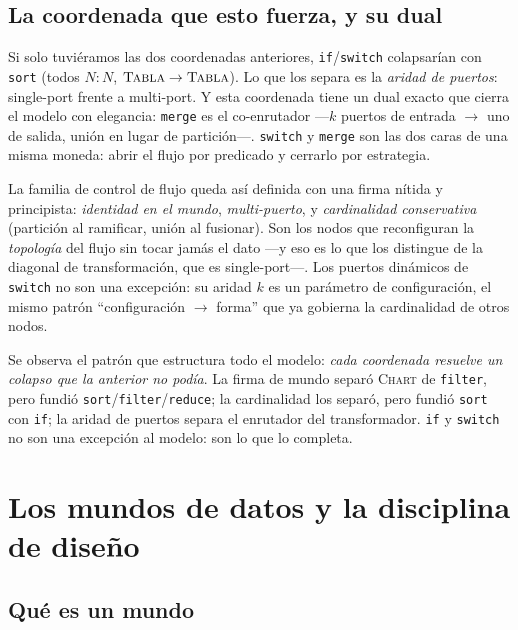 \documentclass[11pt,a4paper]{article}
\theoremstyle{definition}
\theoremstyle{plain}
\newcommand{\mundo}[1]{\textsc{#1}}   %
\begin{document}
\subsection{La coordenada que esto fuerza, y su dual}

Si solo tuviéramos las dos coordenadas anteriores, \texttt{if}/\texttt{switch}
colapsarían con \texttt{sort} (todos $N{:}N$, $\mundo{Tabla}\to\mundo{Tabla}$). Lo
que los separa es la \emph{aridad de puertos}: single-port frente a multi-port. Y
esta coordenada tiene un dual exacto que cierra el modelo con elegancia:
\texttt{merge} es el co-enrutador ---$k$ puertos de entrada $\to$ uno de salida,
unión en lugar de partición---. \texttt{switch} y \texttt{merge} son las dos caras
de una misma moneda: abrir el flujo por predicado y cerrarlo por estrategia.

La familia de control de flujo queda así definida con una firma nítida y
principista: \emph{identidad en el mundo}, \emph{multi-puerto}, y \emph{cardinalidad
conservativa} (partición al ramificar, unión al fusionar). Son los nodos que
reconfiguran la \emph{topología} del flujo sin tocar jamás el dato ---y eso es lo que
los distingue de la diagonal de transformación, que es single-port---. Los puertos
dinámicos de \texttt{switch} no son una excepción: su aridad $k$ es un parámetro de
configuración, el mismo patrón ``configuración $\to$ forma'' que ya gobierna la
cardinalidad de otros nodos.

Se observa el patrón que estructura todo el modelo: \emph{cada coordenada resuelve
un colapso que la anterior no podía}. La firma de mundo separó \mundo{Chart} de
\texttt{filter}, pero fundió \texttt{sort}/\texttt{filter}/\texttt{reduce}; la
cardinalidad los separó, pero fundió \texttt{sort} con \texttt{if}; la aridad de
puertos separa el enrutador del transformador. \texttt{if} y \texttt{switch} no son
una excepción al modelo: son lo que lo completa.

\section{Los mundos de datos y la disciplina de diseño}

\subsection{Qué es un mundo}
\end{document}
